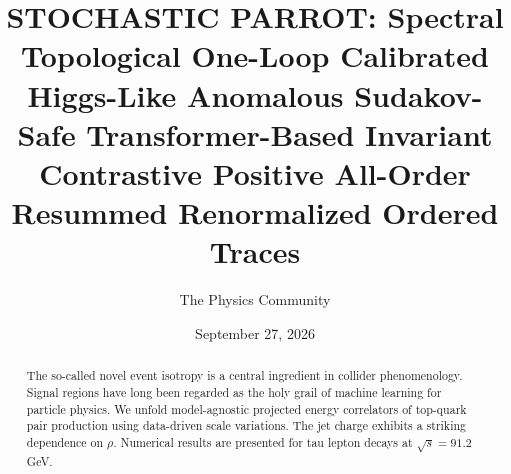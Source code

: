 \documentclass[11pt]{article}
\title{STOCHASTIC PARROT: Spectral Topological One-Loop Calibrated Higgs-Like Anomalous Sudakov-Safe Transformer-Based Invariant Contrastive Positive All-Order Resummed Renormalized Ordered Traces}
\author{The Physics Community}
\date{September 27, 2026}
\numberwithin{equation}{section}
\theoremstyle{definition}
\theoremstyle{remark}
\begin{document}
\maketitle
\begin{abstract}
The so-called novel event isotropy is a central ingredient in collider
phenomenology. Signal regions have long been regarded as the holy grail
of machine learning for particle physics. We unfold model-agnostic
projected energy correlators of top-quark pair production using
data-driven scale variations. The jet charge exhibits a striking
dependence on $\rho$. Numerical results are presented for tau lepton
decays at $\sqrt{s} = 91.2$ GeV.
\end{abstract}
\tableofcontents





\nocite{*}


\end{document}
